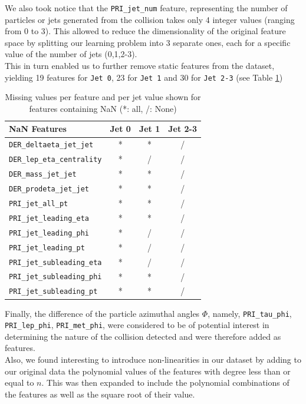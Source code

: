 \documentclass[10pt,conference,compsocconf]{IEEEtran}
\begin{document}
We also took notice that the \verb+PRI_jet_num+ feature, representing the number of particles or jets generated from the collision takes only 4 integer values (ranging from 0 to 3). This allowed to reduce the dimensionality of the original feature space by splitting our learning problem into 3 separate ones, each for a specific value of the number of jets (0,1,2-3).\\
This in turn enabled us to further remove static features from the dataset, yielding 19 features for  \verb+Jet 0+, 23 for \verb+Jet 1+ and 30 for \verb+Jet 2-3+ (see Table \ref{tab_feats})
\begin{table}[h!]
\centering
\caption{Missing values per feature and per jet value shown for features containing NaN (*: all, /: None)}
\footnotesize
\hspace{-0.2cm}
\begin{tabular}{ l| ccc } 
 \hline
   NaN Features & Jet 0 & Jet 1 & Jet 2-3 \\
 \hline
   \verb+DER_deltaeta_jet_jet+  & * & * & /  \\
   \verb+DER_lep_eta_centrality+  & * & / & / \\
   \verb+DER_mass_jet_jet+  & * & * & / \\
   \verb+DER_prodeta_jet_jet+  & * & * & /  \\ 
   \verb+PRI_jet_all_pt+  & * & * & /  \\
   \verb+PRI_jet_leading_eta+  & * & * & / \\
   \verb+PRI_jet_leading_phi+  & * & / & /   \\
   \verb+PRI_jet_leading_pt+  & * & / & / \\
   \verb+PRI_jet_subleading_eta+  & * & / & / \\
   \verb+PRI_jet_subleading_phi+  & * & * & /  \\
   \verb+PRI_jet_subleading_pt+  & * & * & /  \\
  \hline
\end{tabular}
\label{tab_feats}
\end{table}

Finally, the difference of the particle azimuthal angles $\Phi$, namely, \verb+PRI_tau_phi+, \verb+PRI_lep_phi+, \verb+PRI_met_phi+, were considered to be of potential interest  in determining the nature of the collision detected and were therefore added as features. \\
Also, we found interesting to introduce non-linearities in our dataset by adding to our original data the  polynomial values of the features with degree less than or equal to $n$. This was then expanded to include the polynomial combinations of the features as well as the square root of their value. 
\end{document}
